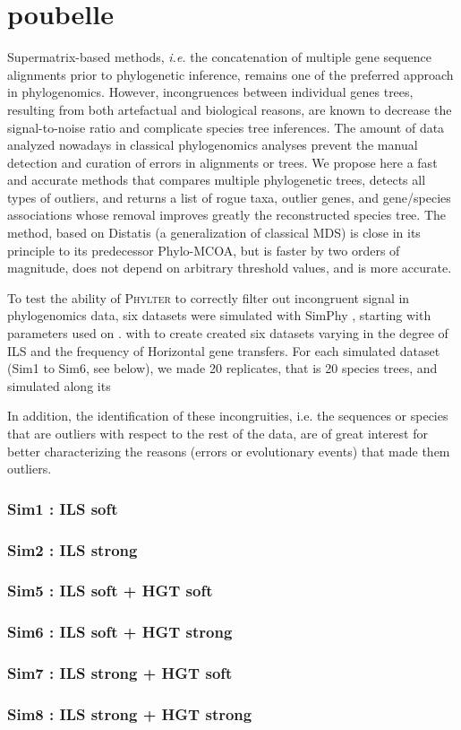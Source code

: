 \documentclass{article}
\begin{document}
\section{poubelle}
Supermatrix-based methods, \textit{i.e.} the concatenation of multiple gene sequence alignments prior to phylogenetic inference, remains one of the preferred approach in phylogenomics. However, incongruences between individual genes trees, resulting from both artefactual and biological reasons, are known to decrease the signal-to-noise ratio and complicate species tree inferences. The amount of data analyzed nowadays in classical phylogenomics analyses prevent the manual detection and curation of errors in alignments or trees. We propose here a fast and accurate methods that compares multiple phylogenetic trees, detects all types of outliers, and returns a list of rogue taxa, outlier genes, and gene/species associations whose removal improves greatly the reconstructed species tree. The method, based on Distatis (a generalization of classical MDS)  is close in its principle to its predecessor Phylo-MCOA, but is faster by two orders of magnitude, does not depend on arbitrary threshold values, and is more accurate. 

To test the ability of \textsc{Phylter} to correctly filter out incongruent signal in phylogenomics data, six datasets were simulated with SimPhy \cite{mallo2016simphy}, starting with parameters used on \cite{bayzid2015weighted}. with to create created six datasets varying in the degree of ILS and the frequency of Horizontal gene transfers. For each simulated dataset (Sim1 to Sim6, see below), we made 20 replicates, that is 20 species trees, and simulated along its  

In addition, the identification of these incongruities, i.e. the sequences or species that are outliers with respect to the rest of the data, are of great interest for better characterizing the reasons (errors or evolutionary events) that made them outliers. 


\subsubsection{Sim1 : ILS soft}


\subsubsection{Sim2 : ILS strong}
\subsubsection{Sim5 : ILS soft + HGT soft}
\subsubsection{Sim6 : ILS soft + HGT strong}
\subsubsection{Sim7 : ILS strong + HGT soft}
\subsubsection{Sim8 : ILS strong + HGT strong}
\end{document}
